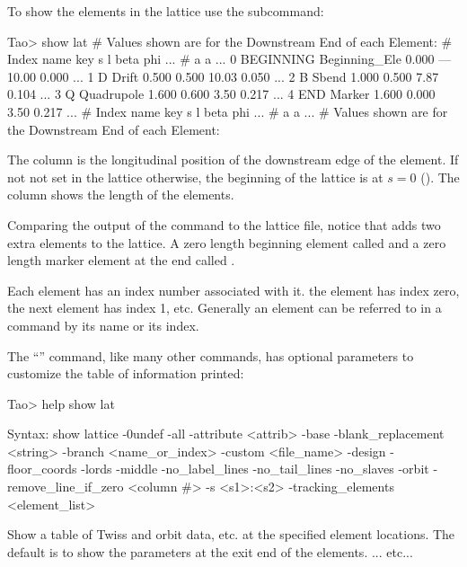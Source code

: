 \documentclass{hitec}     %
\begin{document}
To show the elements in the lattice use the  subcommand:
\begin{code}
Tao> show lat
# Values shown are for the Downstream End of each Element:
# Index  name      key                      s       l    beta     phi ...  
#                                                           a       a ...
     0  BEGINNING Beginning_Ele         0.000     ---   10.00   0.000 ...
     1  D         Drift                 0.500   0.500   10.03   0.050 ...
     2  B         Sbend                 1.000   0.500    7.87   0.104 ...
     3  Q         Quadrupole            1.600   0.600    3.50   0.217 ...
     4  END       Marker                1.600   0.000    3.50   0.217 ...
# Index  name      key                      s       l    beta     phi ...  
#                                                           a       a ...
# Values shown are for the Downstream End of each Element:
\end{code}
The  column is the longitudinal position of the downstream edge of the element. If not not set
in the lattice otherwise, the beginning of the lattice is at $s = 0$ (). The
 column shows the length of the elements.

Comparing the output of the  command to the  lattice file, notice
that \bmad adds two extra elements to the lattice. A zero length beginning element called
 and a zero length marker element at the end called .

Each element has an index number associated with it. the  element has index zero, the
next element has index 1, etc. Generally an element can be referred to in a command by its name or
its index.

The ``'' command, like many other commands, has optional parameters to
customize the table of information printed:

\begin{code}
Tao> help show lat

Syntax:
  show lattice {-0undef} {-all} {-attribute <attrib>} {-base}
      {-blank_replacement <string>}  {-branch <name_or_index>}
      {-custom <file_name>} {-design} {-floor_coords} {-lords} {-middle}
      {-no_label_lines} {-no_tail_lines} {-no_slaves} {-orbit} 
      {-remove_line_if_zero <column #>} {-s <s1>:<s2>} {-tracking_elements}
      {<element_list>}

Show a table of Twiss and orbit data, etc. at the specified element locations. 
The default is to show the parameters at the exit end of the elements. 
... etc...
\end{code}
\end{document}

